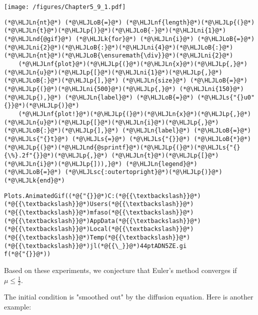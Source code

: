 \documentclass[12pt,a4paper]{article}
\newcommand{\HLJLk}[1]{\textcolor[RGB]{148,91,176}{\textbf{#1}}}
\newcommand{\HLJLn}[1]{#1}
\newcommand{\HLJLnd}[1]{\textcolor[RGB]{214,102,97}{#1}}
\newcommand{\HLJLnf}[1]{\textcolor[RGB]{66,102,213}{#1}}
\newcommand{\HLJLs}[1]{\textcolor[RGB]{201,61,57}{#1}}
\newcommand{\HLJLsc}[1]{\textcolor[RGB]{201,61,57}{#1}}
\newcommand{\HLJLni}[1]{\textcolor[RGB]{59,151,46}{#1}}
\newcommand{\HLJLoB}[1]{\textcolor[RGB]{102,102,102}{\textbf{#1}}}
\newcommand{\HLJLp}[1]{#1}
\begin{document}
\texttt{[image: /figures/Chapter5\_9\_1.pdf]}

\begin{lstlisting}
(*@\HLJLn{nt}@*) (*@\HLJLoB{=}@*) (*@\HLJLnf{length}@*)(*@\HLJLp{(}@*)(*@\HLJLn{t}@*)(*@\HLJLp{)}@*)(*@\HLJLoB{-}@*)(*@\HLJLni{1}@*)
(*@\HLJLnd{@gif}@*) (*@\HLJLk{for}@*) (*@\HLJLn{i}@*) (*@\HLJLoB{=}@*) (*@\HLJLni{2}@*)(*@\HLJLoB{:}@*)(*@\HLJLni{4}@*)(*@\HLJLoB{:}@*)(*@\HLJLn{nt}@*)(*@\HLJLoB{\ensuremath{\div}}@*)(*@\HLJLni{2}@*) 
    (*@\HLJLnf{plot}@*)(*@\HLJLp{(}@*)(*@\HLJLn{x}@*)(*@\HLJLp{,}@*) (*@\HLJLn{u}@*)(*@\HLJLp{[}@*)(*@\HLJLni{1}@*)(*@\HLJLp{,}@*)(*@\HLJLoB{:}@*)(*@\HLJLp{],}@*) (*@\HLJLn{size}@*) (*@\HLJLoB{=}@*) (*@\HLJLp{(}@*)(*@\HLJLni{500}@*)(*@\HLJLp{,}@*) (*@\HLJLni{150}@*)(*@\HLJLp{),}@*) (*@\HLJLn{label}@*) (*@\HLJLoB{=}@*) (*@\HLJLs{"{}u0"{}}@*)(*@\HLJLp{)}@*)
    (*@\HLJLnf{plot!}@*)(*@\HLJLp{(}@*)(*@\HLJLn{x}@*)(*@\HLJLp{,}@*) (*@\HLJLn{u}@*)(*@\HLJLp{[}@*)(*@\HLJLn{i}@*)(*@\HLJLp{,}@*)(*@\HLJLoB{:}@*)(*@\HLJLp{],}@*) (*@\HLJLn{label}@*) (*@\HLJLoB{=}@*) (*@\HLJLs{"{}t}@*) (*@\HLJLs{=}@*) (*@\HLJLs{"{}}@*) (*@\HLJLoB{*}@*) (*@\HLJLp{(}@*)(*@\HLJLnd{@sprintf}@*)(*@\HLJLp{(}@*)(*@\HLJLs{"{}{\%}.2f"{}}@*)(*@\HLJLp{,}@*) (*@\HLJLn{t}@*)(*@\HLJLp{[}@*)(*@\HLJLn{i}@*)(*@\HLJLp{])),}@*) (*@\HLJLn{legend}@*) (*@\HLJLoB{=}@*) (*@\HLJLsc{:outertopright}@*)(*@\HLJLp{)}@*)
(*@\HLJLk{end}@*)
\end{lstlisting}

\begin{lstlisting}
Plots.AnimatedGif((*@{"{}}@*)C:(*@{{\textbackslash}}@*)(*@{{\textbackslash}}@*)Users(*@{{\textbackslash}}@*)(*@{{\textbackslash}}@*)mfaso(*@{{\textbackslash}}@*)(*@{{\textbackslash}}@*)AppData(*@{{\textbackslash}}@*)(*@{{\textbackslash}}@*)Local(*@{{\textbackslash}}@*)(*@{{\textbackslash}}@*)Temp(*@{{\textbackslash}}@*)(*@{{\textbackslash}}@*)jl(*@{{\_}}@*)44ptADN5ZE.gi
f(*@{"{}}@*))
\end{lstlisting}


Based on these experiments, we conjecture that Euler's method converges if $\mu \leq \frac{1}{2}$.

The initial condition is "smoothed out" by the diffusion equation.  Here is another example:
\end{document}
